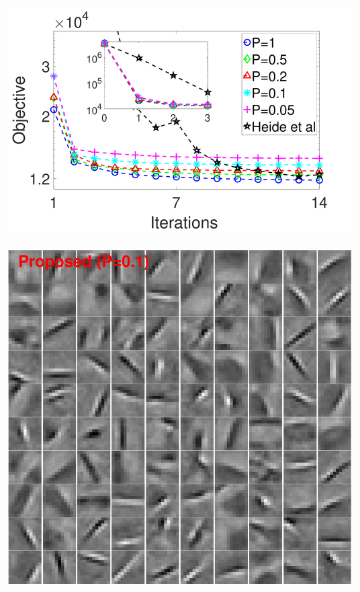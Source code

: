 \begin{figure}[h]
\begin{subfigure}{0.6\textwidth}
  \includegraphics[width=1\linewidth]{figure/iteVSobj.pdf}
\end{subfigure} 
\begin{subfigure}{0.3\textwidth}
  \includegraphics[width=1\linewidth]{figure/batchFruit100.pdf}
\end{subfigure}


\end{figure}
